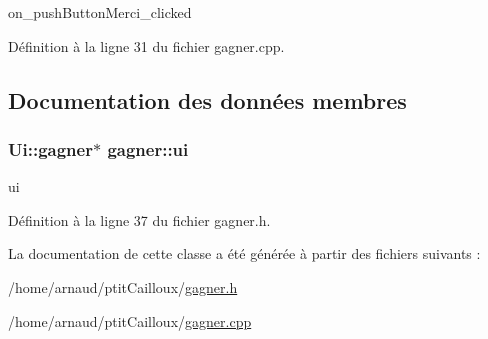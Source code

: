 on\-\_\-push\-Button\-Merci\-\_\-clicked 



Définition à la ligne 31 du fichier gagner.\-cpp.



\subsection{Documentation des données membres}
\hypertarget{classgagner_a4b1df163878c34bff176f83bf01d1c26}{
\subsubsection[{ui}]{\setlength{\rightskip}{0pt plus 5cm}Ui\-::gagner$\ast$ gagner\-::ui\hspace{0.3cm}{\ttfamily [private]}}}\label{classgagner_a4b1df163878c34bff176f83bf01d1c26}


ui 



Définition à la ligne 37 du fichier gagner.\-h.



La documentation de cette classe a été générée à partir des fichiers suivants \-:\begin{DoxyCompactItemize}
\item 
/home/arnaud/ptit\-Cailloux/\hyperlink{gagner_8h}{gagner.\-h}\item 
/home/arnaud/ptit\-Cailloux/\hyperlink{gagner_8cpp}{gagner.\-cpp}\end{DoxyCompactItemize}

